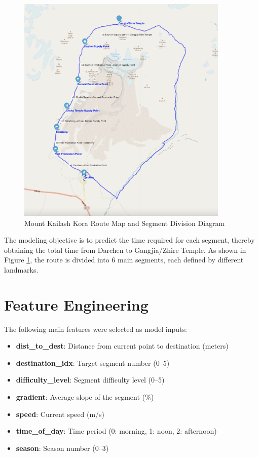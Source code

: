 \documentclass[12pt]{article}
\begin{document}
\begin{figure}[H]
\centering
\includegraphics[width=0.9\textwidth]{visualization_results/karo_track_overview.png}
\caption{Mount Kailash Kora Route Map and Segment Division Diagram}
\label{fig:track_overview}
\end{figure}

The modeling objective is to predict the time required for each segment, thereby obtaining the total time from Darchen to Gangjia/Zhire Temple. As shown in Figure \ref{fig:track_overview}, the route is divided into 6 main segments, each defined by different landmarks.

\section{Feature Engineering}

The following main features were selected as model inputs:

\begin{itemize}
  \item \textbf{dist\_to\_dest}: Distance from current point to destination (meters)
  \item \textbf{destination\_idx}: Target segment number (0–5)
  \item \textbf{difficulty\_level}: Segment difficulty level (0–5)
  \item \textbf{gradient}: Average slope of the segment (\%)
  \item \textbf{speed}: Current speed (m/s)
  \item \textbf{time\_of\_day}: Time period (0: morning, 1: noon, 2: afternoon)
  \item \textbf{season}: Season number (0–3)
\end{itemize}
\end{document}
